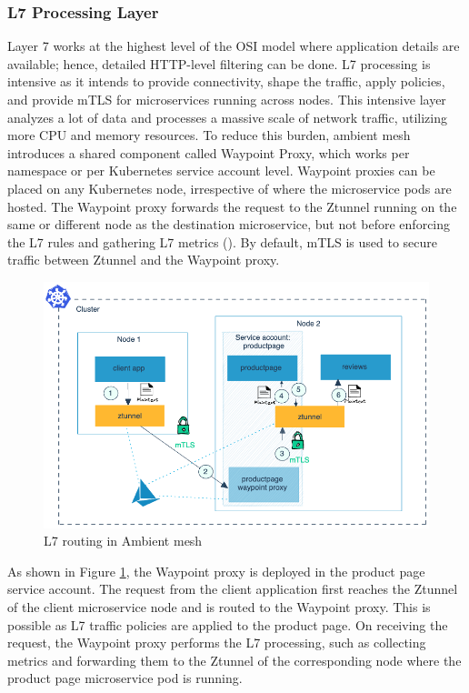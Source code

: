 \subsubsection{L7 Processing Layer}
 Layer 7 works at the highest level of the OSI model where application details are available; hence, detailed HTTP-level filtering can be done. L7 processing is intensive as it intends to provide connectivity, shape the traffic, apply policies, and provide mTLS for microservices running across nodes. This intensive layer analyzes a lot of data and processes a massive scale of network traffic, utilizing more CPU and memory resources. To reduce this burden, ambient mesh introduces a shared component called Waypoint Proxy, which works per namespace or per Kubernetes service account level. Waypoint proxies can be placed on any Kubernetes node, irrespective of where the microservice pods are hosted. The Waypoint proxy forwards the request to the Ztunnel running on the same or different node as the destination microservice, but not before enforcing the L7 rules and gathering L7 metrics (\cite{glooDocs}). By default, mTLS is used to secure traffic between Ztunnel and the Waypoint proxy.

 \begin{figure}[ht!]
  \centering
  \includegraphics[width=0.7\linewidth]{resources/ambient-routing-l7.png}
  \caption{L7 routing in Ambient mesh}
  \label{lr:waypointDesign}
 \end{figure}

As shown in Figure \ref{lr:waypointDesign}, the Waypoint proxy is deployed in the product page service account. The request from the client application first reaches the Ztunnel of the client microservice node and is routed to the Waypoint proxy. This is possible as L7 traffic policies are applied to the product page. On receiving the request, the Waypoint proxy performs the L7 processing, such as collecting metrics and forwarding them to the Ztunnel of the corresponding node where the product page microservice pod is running.

